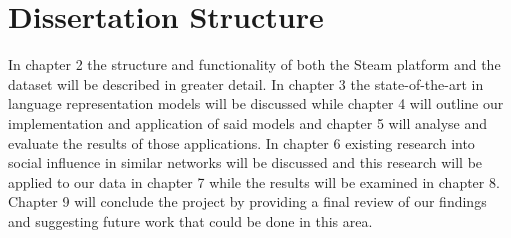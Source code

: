 \section{Dissertation Structure} \label{sec:Intro_Structure}

In chapter 2 the structure and functionality of both the Steam platform and the dataset will be described in greater detail. In chapter 3 the state-of-the-art in language representation models will be discussed while chapter 4 will outline our implementation and application of said models and chapter 5 will analyse and evaluate the results of those applications. In chapter 6 existing research into social influence in similar networks will be discussed and this research will be applied to our data in chapter 7 while the results will be examined in chapter 8. Chapter 9 will conclude the project by providing a final review of our findings and suggesting future work that could be done in this area.
